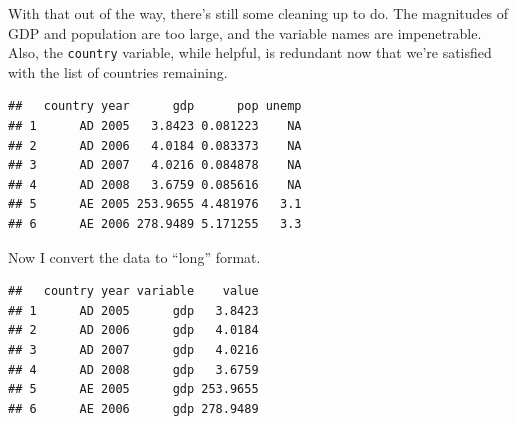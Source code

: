 \documentclass[12pt,oneside,openany]{book}
\newenvironment{Shaded}{\begin{snugshade}}{\end{snugshade}}
\newcommand{\KeywordTok}[1]{\textcolor[rgb]{0.13,0.29,0.53}{\textbf{{#1}}}}
\newcommand{\DataTypeTok}[1]{\textcolor[rgb]{0.13,0.29,0.53}{{#1}}}
\newcommand{\FloatTok}[1]{\textcolor[rgb]{0.00,0.00,0.81}{{#1}}}
\newcommand{\StringTok}[1]{\textcolor[rgb]{0.31,0.60,0.02}{{#1}}}
\newcommand{\NormalTok}[1]{{#1}}
\begin{document}
With that out of the way, there's still some cleaning up to do. The
magnitudes of GDP and population are too large, and the variable names
are impenetrable. Also, the \texttt{country} variable, while helpful, is
redundant now that we're satisfied with the list of countries remaining.

\begin{Shaded}
\end{Shaded}

\begin{verbatim}
##   country year      gdp      pop unemp
## 1      AD 2005   3.8423 0.081223    NA
## 2      AD 2006   4.0184 0.083373    NA
## 3      AD 2007   4.0216 0.084878    NA
## 4      AD 2008   3.6759 0.085616    NA
## 5      AE 2005 253.9655 4.481976   3.1
## 6      AE 2006 278.9489 5.171255   3.3
\end{verbatim}

Now I convert the data to ``long'' format.

\begin{Shaded}
\end{Shaded}

\begin{verbatim}
##   country year variable    value
## 1      AD 2005      gdp   3.8423
## 2      AD 2006      gdp   4.0184
## 3      AD 2007      gdp   4.0216
## 4      AD 2008      gdp   3.6759
## 5      AE 2005      gdp 253.9655
## 6      AE 2006      gdp 278.9489
\end{verbatim}
\end{document}
